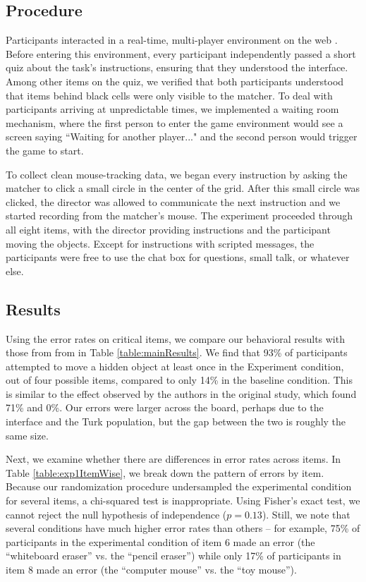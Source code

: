 \documentclass[10pt,letterpaper]{article}
\begin{document}
\subsection{Procedure}

Participants interacted in a real-time, multi-player environment on the web \cite{Hawkins15_RealTimeWebExperiments}. Before entering this environment, every participant independently passed a short quiz about the task's instructions, ensuring that they understood the interface. Among other items on the quiz, we verified that both participants understood that items behind black cells were only visible to the matcher. To deal with participants arriving at unpredictable times, we implemented a waiting room mechanism, where the first person to enter the game environment would see a screen saying ``Waiting for another player..." and the second person would trigger the game to start. 

To collect clean mouse-tracking data, we began every instruction by asking the matcher to click a small circle in the center of the grid. After this small circle was clicked, the director was allowed to communicate the next instruction and we started recording from the matcher's mouse. The experiment proceeded through all eight items, with the director providing instructions and the participant moving the objects. Except for instructions with scripted messages, the participants were free to use the chat box for questions, small talk, or whatever else.

\subsection{Results}

Using the error rates on critical items, we compare our behavioral results with those from from  in Table \ref{table:mainResults}. We find that 93\% of participants attempted to move a hidden object at least once in the Experiment condition, out of four possible items, compared to only 14\% in the baseline condition. This is similar to the effect observed by the authors in the original study, which found 71\% and 0\%. Our errors were larger across the board, perhaps due to the interface and the Turk population, but the gap between the two is roughly the same size.

Next, we examine whether there are differences in error rates across items. In Table \ref{table:exp1ItemWise}, we break down the pattern of errors by item. Because our randomization procedure undersampled the experimental condition for several items, a chi-squared test is inappropriate. Using Fisher's exact test, we cannot reject the null hypothesis of independence ($p = 0.13$). Still, we note that several conditions have much higher error rates than others -- for example, 75\% of participants in the experimental condition of item 6 made an error (the ``whiteboard eraser'' vs. the ``pencil eraser'') while only 17\% of participants in item 8 made an error (the ``computer mouse'' vs. the ``toy mouse''). 
\end{document}
